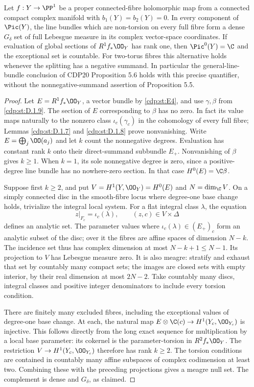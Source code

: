 
\begin{proposition}\label{cdp:st:D.1.11}
Let $f:Y\to\PP^1$ be a proper connected-fibre holomorphic map from
a connected compact complex manifold with $b_1(Y)=b_2(Y)=0$.
In every component of $\Pic(Y)$, the line
bundles which are non-torsion on every full fibre form a dense
$G_\delta$ set of full Lebesgue measure in its complex vector-space
coordinates. If evaluation of global sections of $R^1f_*\OO_Y$
has rank one, then $\Pic^0(Y)=\C$ and the exceptional set is
countable. For two-torus fibres this alternative holds whenever
the splitting has a negative summand.
In particular the general-line-bundle conclusion of CDP20
Proposition 5.6 holds with this precise quantifier, without the
nonnegative-summand assertion of Proposition 5.5.
\end{proposition}
\begin{proof}
Let $E=R^1f_*\OO_Y$, a vector bundle by \ref{cdp:st:E4}, and use
$\gamma,\beta$ from \ref{cdp:st:D.1.9}. The section of $E$ corresponding to
$\beta$ has no zero. In fact its value maps naturally to the
nonzero class $\iota_c(\gamma_c)$ in the cohomology of every full
fibre; Lemmas \ref{cdp:st:D.1.7} and \ref{cdp:st:D.1.8} prove nonvanishing. Write
$E=\bigoplus_j\OO(a_j)$ and let $k$ count the nonnegative degrees.
Evaluation has constant rank $k$ onto their direct-summand subbundle
$E_+$. Nonvanishing of $\beta$ gives $k\geq1$. When $k=1$, its
sole nonnegative degree is zero, since a positive-degree line bundle
has no nowhere-zero section. In that case $H^0(E)=\C\beta$.

Suppose first $k\geq2$, and put $V=H^1(Y,\OO_Y)=H^0(E)$ and
$N=\dim_{\C}V$. On a simply connected disc in the smooth-fibre
locus where degree-one base change holds, trivialize the integral
local system. For a flat integral
class $\lambda$, the equation
\[
z|_{F_c}=\iota_c(\lambda),\qquad (z,c)\in V\times\Delta
\]
defines an analytic set. The parameter values where
$\iota_c(\lambda)\in(E_+)_c$ form an analytic subset of the disc;
over it the fibres are affine spaces of dimension $N-k$.
The incidence set thus has complex dimension at most
$N-k+1\leq N-1$. Its projection to $V$ has Lebesgue
measure zero. It is also meagre: stratify and exhaust that set
by countably many compact sets; the images are closed sets with
empty interior, by their real dimension at most $2N-2$.
Take countably many discs, integral classes and positive integer
denominators to include every torsion condition.

There are finitely many excluded fibres, including the exceptional
values of degree-one base change. At each, the natural map
$E\otimes\C(c)\to H^1(Y_c,\OO_{Y_c})$ is injective. This follows
directly from the long exact sequence for multiplication by a local
base parameter: its cokernel is the parameter-torsion in
$R^2f_*\OO_Y$. The restriction $V\to H^1(Y_c,\OO_{Y_c})$
therefore has rank $k\geq2$. The torsion conditions are contained in
countably many affine subspaces of complex codimension at least
two. Combining these with the preceding projections gives a
meagre null set. The complement is dense and $G_\delta$, as claimed.


\end{proof}
